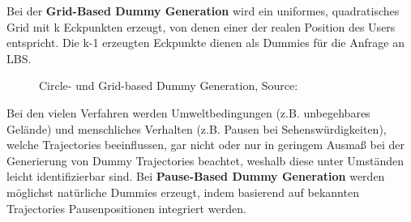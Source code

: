 Bei der \textbf{Grid-Based Dummy Generation} \cite{Lu2008} wird ein uniformes, quadratisches Grid mit k Eckpunkten erzeugt, von denen einer der realen Position des Users entspricht. Die k-1 erzeugten Eckpunkte dienen als Dummies für die Anfrage an LBS.
\begin{figure}[!h]
	\centering
	\caption{Circle- und Grid-based Dummy Generation, Source: \protect\cite{Lu2008}}
	\label{fig_Lu2008}
\end{figure}

Bei den vielen Verfahren werden Umweltbedingungen (z.B. unbegehbares Gelände) und menschliches Verhalten (z.B. Pausen bei Sehenswürdigkeiten), welche Trajectories beeinflussen, gar nicht oder nur in geringem Ausmaß bei der Generierung von Dummy Trajectories beachtet, weshalb diese unter Umständen leicht identifizierbar sind. Bei \textbf{Pause-Based Dummy Generation} \cite{Kato2012} werden möglichst natürliche Dummies erzeugt, indem basierend auf bekannten Trajectories Pausenpositionen integriert werden.